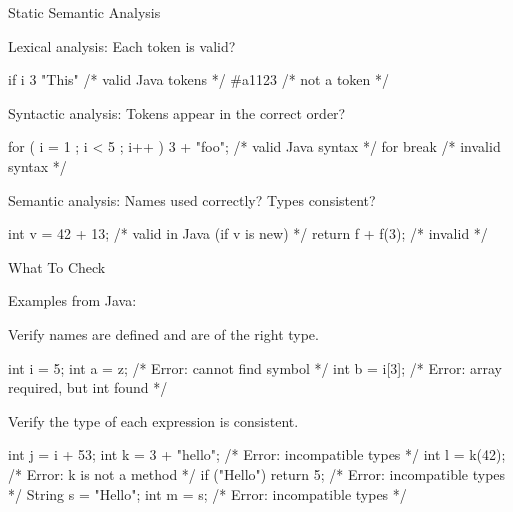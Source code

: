 \documentclass{plt}
\begin{document}
\begin{frame}[fragile]{Static Semantic Analysis}

Lexical analysis: Each token is valid?

\begin{java}
if i 3 "This"                /* valid Java tokens */
#a1123                       /* not a token */
\end{java}

Syntactic analysis: Tokens appear in the correct order?

\begin{java}
for ( i = 1 ; i < 5 ; i++ ) 3 + "foo";  /* valid Java syntax */
for break                               /* invalid syntax */
\end{java}

Semantic analysis: Names used correctly? Types consistent?

\begin{java}
int v = 42 + 13;    /* valid in Java (if v is new) */
return f + f(3);    /* invalid */
\end{java}

\end{frame}

\begin{frame}[fragile]{What To Check}

Examples from Java:

Verify names are defined and are of the right type.

\begin{java}
int i = 5;
int a = z;    /* Error: cannot find symbol */
int b = i[3]; /* Error: array required, but int found */
\end{java}

Verify the type of each expression is consistent.

\begin{java}
int j = i + 53;
int k = 3 + "hello";   /* Error: incompatible types */
int l = k(42);         /* Error: k is not a method */
if ("Hello") return 5; /* Error: incompatible types */
String s = "Hello";
int m = s;             /* Error: incompatible types */
\end{java}

\end{frame}
\end{document}
